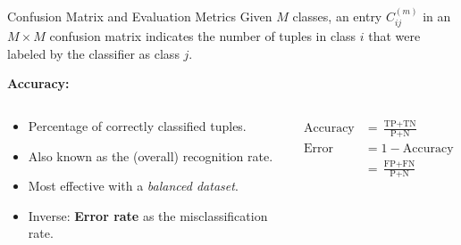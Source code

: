 \begin{frame}{Confusion Matrix and Evaluation Metrics}
	Given $M$ classes, an entry $C^{(m)}_{ij}$ in an $M \times M$ confusion matrix
	indicates the number of tuples in class $i$ that were labeled by the
	classifier as class $j$.
	

	\textbf{Accuracy:}
	\vspace*{-1em}
	\begin{columns}
		\begin{column}{0.55\textwidth}
			\begin{itemize}
				\item Percentage of correctly classified tuples.
				\item Also known as the (overall) recognition rate.
				\item Most effective with a \textit{balanced dataset}.
				\item Inverse: \textbf{Error rate} as the misclassification rate.
			\end{itemize}
		\end{column}
		\begin{column}{0.4\textwidth}
			\vspace*{-1.2em}
			\begin{align*}
				\text{Accuracy}   & = \frac{\text{TP} + \text{TN}}{\text{P} +  \text{N}} \\
				\text{Error Rate} & = 1 - \text{Accuracy}                                \\
				                  & = \frac{\text{FP} + \text{FN}}{\text{P} + \text{N}}
			\end{align*}
		\end{column}
	\end{columns}
\end{frame}

